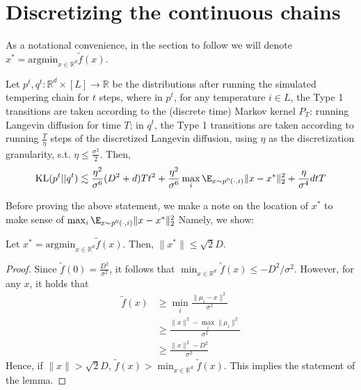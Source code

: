 \section{Discretizing the continuous chains} 

As a notational convenience, in the section to follow we will denote $x^* = \mbox{argmin}_{x \in \mathbb{R}^d} \tilde{f}(x)$. 

\begin{lem} Let $p^t, q^t: \mathbb{R}^d \times [L]  \to \mathbb{R}$ be the distributions after running the simulated tempering chain for $t$ steps, where in $p^t$, for any temperature $i \in L$, the Type 1 transitions are taken according to the (discrete time) Markov kernel $P_T$: running Langevin diffusion for time $T$; in $q^t$, the Type 1 transitions are taken according to running $\frac{T}{\eta}$ steps of the discretized Langevin diffusion, using $\eta$ as the discretization granularity, s.t. $\eta \leq \frac{\sigma^2}{2}$.  
Then, 
\begin{align*} \mbox{KL} (p^t || q^t) \lesssim \frac{\eta^2}{\sigma^6} (D^2+d) T t^2 + \frac{\eta^2}{\sigma^6} \max_i \E_{x \sim p^0( \cdot, i)}\|x - x^*\|_2^2 + \frac{\eta}{\sigma^4} d t T  \end{align*}
\label{l:maindiscretize}
\end{lem} 


Before proving the above statement, we make a note on the location of $x^*$ to make sense of $\max_i \E_{x \sim p^0( \cdot, i)}\|x - x^*\|_2^2$ Namely, we show:  

\begin{lem} Let $x^* = \mbox{argmin}_{x \in \mathbb{R}^d} \tilde{f}(x)$. Then, $\|x^*\| \leq \sqrt{2} D$.  
\label{l:locatemin}
\end{lem} 
\begin{proof} 
Since $\tilde{f}(0) = \frac{D^2}{\sigma^2}$, it follows that $\min_{x \in \mathbb{R}^d} \tilde{f}(x) \leq -D^2/\sigma^2$. However, for any $x$, it holds that 
\begin{align*} \tilde{f}(x) &\geq \min_i \frac{\|\mu_i - x\|^2}{\sigma^2} \\
&\geq \frac{\|x\|^2 - \max_i\|\mu_i\|^2}{\sigma^2} \\
&\geq \frac{\|x\|^2 - D^2}{\sigma^2} \end{align*} 
Hence, if $\|x\| > \sqrt{2} D$, $\tilde{f}(x) >  \min_{x \in \mathbb{R}^d} \tilde{f}(x)$. This implies the statement of the lemma. 
\end{proof} 

